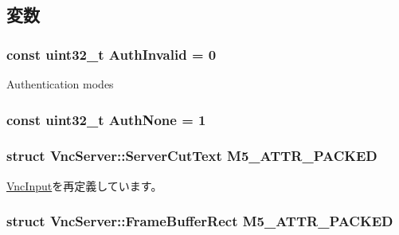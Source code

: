 \subsection{変数}
\hypertarget{group__VncConstants_ga0adb6517a8a2c8403f7aff85bad3dfa5}{
\subsubsection[{AuthInvalid}]{\setlength{\rightskip}{0pt plus 5cm}const {\bf uint32\_\-t} AuthInvalid = 0}}
\label{group__VncConstants_ga0adb6517a8a2c8403f7aff85bad3dfa5}
Authentication modes \hypertarget{group__VncConstants_gabc058a28bda6e015dbafe8bbfbddb821}{
\subsubsection[{AuthNone}]{\setlength{\rightskip}{0pt plus 5cm}const {\bf uint32\_\-t} AuthNone = 1}}
\label{group__VncConstants_gabc058a28bda6e015dbafe8bbfbddb821}
\hypertarget{group__VncConstants_gac782a3823c0bb07395a234047394d59e}{
\subsubsection[{M5\_\-ATTR\_\-PACKED}]{\setlength{\rightskip}{0pt plus 5cm}struct {\bf VncServer::ServerCutText}  {\bf M5\_\-ATTR\_\-PACKED}}}
\label{group__VncConstants_gac782a3823c0bb07395a234047394d59e}


\hyperlink{classVncInput_a6461d9ad3aa5b6efe59b090c8e8f38af}{VncInput}を再定義しています。\hypertarget{group__VncConstants_gab34a91a8552f4b2f7e2806b835f39780}{
\subsubsection[{M5\_\-ATTR\_\-PACKED}]{\setlength{\rightskip}{0pt plus 5cm}struct {\bf VncServer::FrameBufferRect}  {\bf M5\_\-ATTR\_\-PACKED}}}
\label{group__VncConstants_gab34a91a8552f4b2f7e2806b835f39780}


